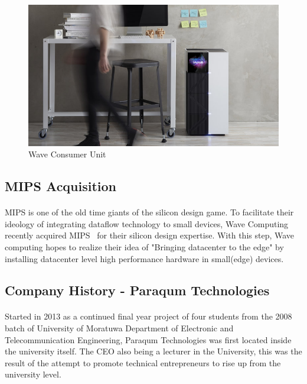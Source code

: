 \begin{figure}[h]
    \centering
    \includegraphics[trim=0cm 0cm 0cm 0cm, clip=true,scale=1]{figures/wave_lab.jpg}
    \caption{Wave Consumer Unit\label{Fig:wavelab}}\vspace{-4mm}
    \end{figure}

\subsection*{MIPS Acquisition}
\paragraph{}
MIPS is one of the old time giants of the silicon design game. To facilitate their ideology of integrating dataflow technology to small devices, Wave Computing recently acquired MIPS~\cite{mipsaq} for their silicon design expertise. With this step, Wave computing hopes to realize their idea of "Bringing datacenter to the edge" by installing datacenter level high performance hardware in small(edge) devices.

\subsection{Company History - Paraqum Technologies}
\paragraph{}
Started in 2013 as a continued final year project of four students from the 2008 batch of University of Moratuwa Department of Electronic and Telecommunication Engineering, Paraqum Technologies was first located inside the university itself. The CEO also being a lecturer in the University, this was the result of the attempt to promote technical entrepreneurs to rise up from the university level.

